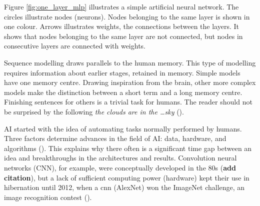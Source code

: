 Figure \ref{fig:one_layer_mlp} illustrates a simple artificial neural network. The circles illustrate nodes (neurons). Nodes belonging to the same layer is shown in one colour. Arrows illustrates weights, the connections between the layers. It shows that nodes belonging to the same layer are not connected, but nodes in consecutive layers are connected with weights. 



Sequence modelling draws parallels to the human memory. This type of modelling requires information about earlier stages, retained in memory. Simple models have one memory centre. Drawing inspiration from the brain, other more complex models make the distinction between a short term and a long memory centre. Finishing sentences for others is a trivial task for humans. The reader should not be surprised by the following \textit{the clouds are in the \ldots sky} (\cite{colah_blog_post}).

AI started with the idea of automating tasks normally performed by humans. Three factors determine advances in the field of AI: data, hardware, and algorithms (\cite{chollet_book}). This explains why there often is a significant time gap between an idea and breakthroughs in the architectures and results. Convolution neural networks (CNN), for example, were conceptually developed in the 80s (\textbf{add citation}), but a lack of sufficient computing power (hardware) kept their use in hibernation until 2012, when a \acrshort{cnn} (AlexNet) won the ImageNet challenge, an image recognition contest (\cite{AlexNet}).

